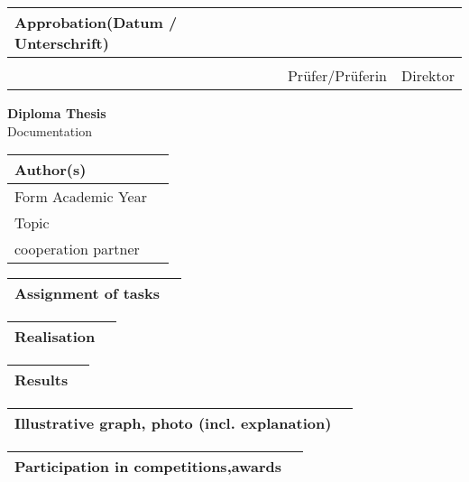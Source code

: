 \documentclass[letterpaper,10pt]{article}
\begin{document}
\begin{tabular*}{\textwidth}{|l | l| l |}
    \hline
    Approbation(Datum / Unterschrift) & & \\
    \hline
     & & \\
    & Prüfer/Prüferin & Direktor \\
    \hline
\end{tabular*}

\pagebreak

\begin{center}
    \textbf{\Huge{Diploma Thesis}} \\
    \huge{Documentation}
\end{center}

\begin{tabular*}{\textwidth}{|l | l|}
    \hline
    Author(s) & \\
    \hline
    Form Academic Year & \\
    \hline
    Topic & \\
    \hline
    cooperation partner \\
    \hline
\end{tabular*}


\begin{tabular*}{\textwidth}{|l | l|}
    \hline
    Assignment of tasks & \\

    \hline
\end{tabular*}

\begin{tabular*}{\textwidth}{|l | l|}
    \hline
    Realisation & \\

    \hline
\end{tabular*}


\begin{tabular*}{\textwidth}{|l | l|}
    \hline
    Results & \\

    \hline
\end{tabular*}


\begin{tabular*}{\textwidth}{|l | l|}
    \hline
    Illustrative graph, photo
(incl. explanation) & \\

    \hline
\end{tabular*}


\begin{tabular*}{\textwidth}{|l | l|}
    \hline
    Participation in competitions,awards & \\

    \hline
\end{tabular*}
\end{document}
